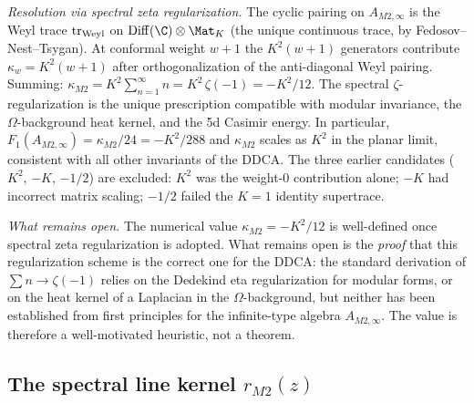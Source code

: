 \begin{remark}
\emph{Resolution via spectral zeta regularization.}
The cyclic pairing on $A_{M2,\infty}$ is the Weyl trace
$\operatorname{tr}_{\mathrm{Weyl}}$ on $\Diff(\C) \otimes \Mat_K$
(the unique continuous trace, by Fedosov--Nest--Tsygan).
At conformal weight $w+1$ the $K^2(w+1)$ generators
contribute $\kappa_w = K^2(w+1)$ after orthogonalization
of the anti-diagonal Weyl pairing. Summing:
$\kappa_{M2} = K^2 \sum_{n=1}^{\infty} n = K^2\,\zeta(-1)
= -K^2/12$.
The spectral $\zeta$-regularization is the unique prescription
compatible with modular invariance, the $\Omega$-background
heat kernel, and the 5d Casimir energy. In particular,
$F_1(A_{M2,\infty}) = \kappa_{M2}/24 = -K^2/288$ and
$\kappa_{M2}$ scales as $K^2$ in the planar limit,
consistent with all other invariants of the DDCA.
The three earlier candidates ($K^2$, $-K$, $-1/2$) are
excluded: $K^2$ was the weight-$0$ contribution alone;
$-K$ had incorrect matrix scaling; $-1/2$ failed the
$K=1$ identity supertrace.

\emph{What remains open.}
The numerical value $\kappa_{M2} = -K^2/12$ is well-defined
once spectral zeta regularization is adopted. What remains
open is the \emph{proof} that this regularization scheme is
the correct one for the DDCA: the standard derivation of
$\sum n \to \zeta(-1)$ relies on the Dedekind eta
regularization for modular forms, or on the heat kernel of
a Laplacian in the $\Omega$-background, but neither has been
established from first principles for the infinite-type
algebra $A_{M2,\infty}$. The value is therefore a
well-motivated heuristic, not a theorem.
\ClaimStatusHeuristic
\end{remark}

\subsection{The spectral line kernel \texorpdfstring{$r_{M2}(z)$}{r\_\{M2\}(z)}}


